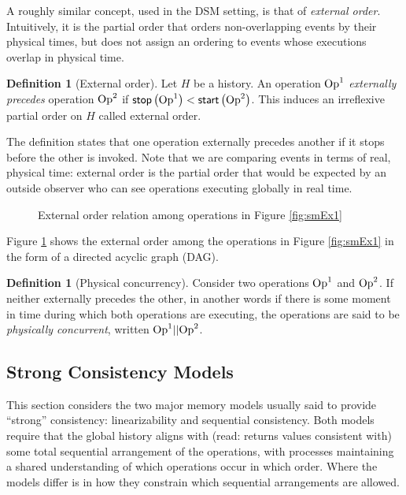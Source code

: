 \documentclass[]             %
{NASA}                       %
\theoremstyle{definition}
\newtheorem{definition}[theorem]{Definition}
\begin{document}
A roughly similar concept, used in the DSM setting, is that of
\emph{external order}. Intuitively, it is the partial order that
orders non-overlapping events by their physical times, but does not
assign an ordering to events whose executions overlap in physical
time.
\begin{definition}[External order]
  Let $H$ be a history. An operation $\mathrm{Op}^1$ \emph{externally
    precedes} operation $\mathrm{Op}^2$ if
  $\mathsf{stop}\left(\mathrm{Op}^1\right) < \mathsf{start}\left(\mathrm{Op}^2\right)$. This induces an irreflexive
  partial order on $H$ called external order.
\end{definition}
The definition states that one operation externally precedes another
if it stops before the other is invoked. Note that we are comparing
events in terms of real, physical time: external order is the partial
order that would be expected by an outside observer who can see
operations executing globally in real time.

\begin{figure}
  \centering
  
  \caption{External order relation among operations in Figure \ref{fig:smEx1}}
  \label{fig:smEx1DAG}
\end{figure}

Figure \ref{fig:smEx1DAG} shows the external order among the
operations in Figure \ref{fig:smEx1} in the form of a directed
acyclic graph (DAG).


\begin{definition}[Physical concurrency]
  Consider two operations $\mathrm{Op}^1$ and $\mathrm{Op}^2$. If neither externally
  precedes the other, in another words if there is some moment in time
  during which both operations are executing, the operations are said
  to be \emph{physically concurrent}, written $\mathrm{Op}^1 || \mathrm{Op}^2$.
\end{definition}

\subsection{Strong Consistency Models}
\label{ssec:strong-consistency}
This section considers the two major memory models usually said
to provide ``strong'' consistency: linearizability and sequential
consistency. Both models require that the global history aligns with
(read: returns values consistent with) some total sequential arrangement of the operations, with processes maintaining a shared understanding of which operations occur
in which order. Where the models differ is in how they constrain which
sequential arrangements are allowed.
\end{document}
